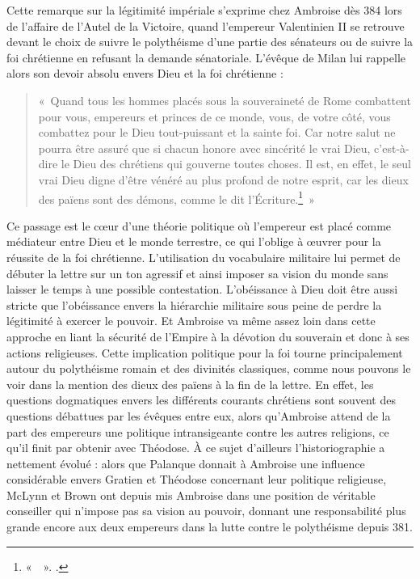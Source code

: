 \bigskip

Cette remarque sur la légitimité impériale s'exprime chez Ambroise dès 384 lors de l'affaire de l'Autel de la Victoire, quand l'empereur Valentinien II se retrouve devant le choix de suivre le polythéisme d'une partie des sénateurs ou de suivre la foi chrétienne en refusant la demande sénatoriale. L'évêque de Milan lui rappelle alors son devoir absolu envers Dieu et la foi chrétienne :

\bigskip

\begin{quote}
«~Quand tous les hommes placés sous la souveraineté de Rome combattent pour vous, empereurs et princes de ce monde, vous, de votre côté, vous combattez pour le Dieu tout-puissant et la sainte foi. Car notre salut ne pourra être assuré que si chacun honore avec sincérité le vrai Dieu, c'est-à-dire le Dieu des chrétiens qui gouverne toutes choses. Il est, en effet, le seul vrai Dieu digne d'être vénéré au plus profond de notre esprit, car les dieux des païens sont des démons, comme le dit l'Écriture.\footnote{«~~». \cite[,1]{ambroise_lettres}.}~»
\end{quote}

\bigskip

Ce passage est le cœur d'une théorie politique où l'empereur est placé comme médiateur entre Dieu et le monde terrestre, ce qui l'oblige à œuvrer pour la réussite de la foi chrétienne. L'utilisation du vocabulaire militaire lui permet de débuter la lettre sur un ton agressif et ainsi imposer sa vision du monde sans laisser le temps à une possible contestation. L'obéissance à Dieu doit être aussi stricte que l'obéissance envers la hiérarchie militaire sous peine de perdre la légitimité à exercer le pouvoir. Et Ambroise va même assez loin dans cette approche en liant la sécurité de l'Empire à la dévotion du souverain et donc à ses actions religieuses. Cette implication politique pour la foi tourne principalement autour du polythéisme romain et des divinités classiques, comme nous pouvons le voir dans la mention des dieux des païens à la fin de la lettre. En effet, les questions dogmatiques envers les différents courants chrétiens sont souvent des questions débattues par les évêques entre eux, alors qu'Ambroise attend de la part des empereurs une politique intransigeante contre les autres religions, ce qu'il finit par obtenir avec Théodose. À ce sujet d'ailleurs l'historiographie a nettement évolué : alors que Palanque donnait à Ambroise une influence considérable envers Gratien et Théodose concernant leur politique religieuse, McLynn et Brown ont depuis mis Ambroise dans une position de véritable conseiller qui n'impose pas sa vision au pouvoir, donnant une responsabilité plus grande encore aux deux empereurs dans la lutte contre le polythéisme depuis 381.

